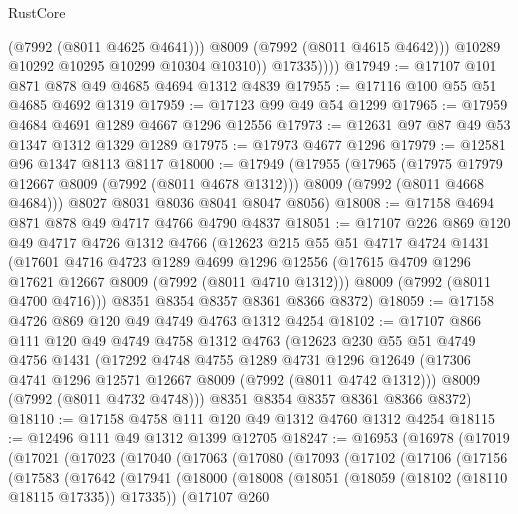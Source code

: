 \begin{lexlean}{RustCore}
\begin{coremodule}
                    (@7992 (@8011 @4625 @4641)))
                  @8009
                  (@7992 (@8011 @4615 @4642)))
                @10289
                @10292
                @10295
                @10299
                @10304
                @10310))
            @17335))))
@17949 := @17107 @101 @871 @878 @49 @4685 @4694 @1312 @4839
@17955 := @17116 @100 @55 @51 @4685 @4692 @1319
@17959 := @17123 @99 @49 @54 @1299
@17965 := @17959 @4684 @4691 @1289 @4667 @1296 @12556
@17973 := @12631 @97 @87 @49 @53 @1347 @1312 @1329 @1289
@17975 := @17973 @4677 @1296
@17979 := @12581 @96 @1347 @8113 @8117
@18000 := @17949
    (@17955
      (@17965
        (@17975 @17979 @12667 @8009 (@7992 (@8011 @4678 @1312)))
        @8009
        (@7992 (@8011 @4668 @4684)))
      @8027
      @8031
      @8036
      @8041
      @8047
      @8056)
@18008 := @17158 @4694 @871 @878 @49 @4717 @4766 @4790 @4837
@18051 := @17107
    @226
    @869
    @120
    @49
    @4717
    @4726
    @1312
    @4766
    (@12623
      @215
      @55
      @51
      @4717
      @4724
      @1431
      (@17601
        @4716
        @4723
        @1289
        @4699
        @1296
        @12556
        (@17615 @4709 @1296 @17621 @12667 @8009 (@7992 (@8011 @4710 @1312)))
        @8009
        (@7992 (@8011 @4700 @4716)))
      @8351
      @8354
      @8357
      @8361
      @8366
      @8372)
@18059 := @17158 @4726 @869 @120 @49 @4749 @4763 @1312 @4254
@18102 := @17107
    @866
    @111
    @120
    @49
    @4749
    @4758
    @1312
    @4763
    (@12623
      @230
      @55
      @51
      @4749
      @4756
      @1431
      (@17292
        @4748
        @4755
        @1289
        @4731
        @1296
        @12649
        (@17306 @4741 @1296 @12571 @12667 @8009 (@7992 (@8011 @4742 @1312)))
        @8009
        (@7992 (@8011 @4732 @4748)))
      @8351
      @8354
      @8357
      @8361
      @8366
      @8372)
@18110 := @17158 @4758 @111 @120 @49 @1312 @4760 @1312 @4254
@18115 := @12496 @111 @49 @1312 @1399 @12705
@18247 := @16953
    (@16978
      (@17019
        (@17021
          (@17023
            (@17040
              (@17063
                (@17080
                  (@17093
                    (@17102
                      (@17106
                        (@17156
                          (@17583
                            (@17642
                              (@17941
                                (@18000
                                  (@18008
                                    (@18051 (@18059 (@18102 (@18110 @18115 @17335)) @17335))
                                    (@17107
                                      @260

\end{coremodule}
\end{lexlean}
